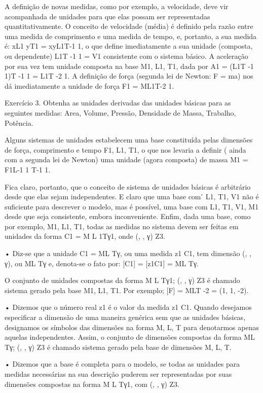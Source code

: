     A definição de novas medidas, como por exemplo, a velocidade, deve vir acompanhada de unidades para que elas possam ser representadas quantitativamente. O conceito de velocidade (média) é definido pela razão entre uma medida de comprimento e uma medida de tempo, e, portanto, a sua medida é: xL1 yT1 = xyL1T-1 1, o que define imediatamente a sua unidade (composta, ou dependente) L1T -1 1 = V1 consistente com o sistema básico. A aceleração por sua vez tem unidade composta na base {M1, L1, T1}, dada por A1 = (L1T -1 1)T -1 1 = L1T -2 1. A definição de força (segunda lei de Newton:
F = ma) nos dá imediatamente a unidade de força F1 = ML1T-2 1.

Exercício 3. Obtenha as unidades derivadas das unidades básicas para as seguintes medidas: Area, Volume, Pressão, Densidade de Massa, Trabalho, Potência.

Alguns sistemas de unidades estabelecem uma base constituída pelas dimensões de força, comprimento e tempo {F1, L1, T1}, o que nos levaria a definir ( ainda com a segunda lei de Newton) uma unidade (agora composta) de massa M1 = F1L-1 1 T-1 1.

Fica claro, portanto, que o conceito de sistema de unidades básicas é arbitrário desde que elas sejam independentes. E claro que uma base com  ́ {L1, T1, V1} não é suficiente para descrever o modelo, mas é possível, uma base com {L1, T1, V1, M1} desde que seja
consistente, embora inconveniente. Enfim, dada uma base, como por exemplo, {M1, L1, T1}, todas as medidas no sistema
devem ser feitas em unidades da forma C1 = M L
\beta1Tγ1, onde (\alpha, \beta, γ) \in Z3.

• Diz-se que a unidade C1 = M\alpha L
\beta Tγ, ou uma medida z1 C1, tem dimensão (\alpha, \beta, γ), ou M\alpha L
\beta Tγ e, denota-se o fato por:
[C1] = [z1C1] = M\alpha L \beta Tγ.

O conjunto de unidades compostas da forma {M L  Tγ1; (\alpha, \beta, γ) \in Z3} é chamado
sistema gerado pela base {M1, L1, T1}. Por exemplo; [F] = MLT -2 = (1, 1, -2).

• Dizemos que o número real z1 é o valor da medida z1 C1. Quando desejamos especificar a dimensão de uma maneira genérica sem que as unidades básicas, designamos os símbolos das dimensões na forma {M, L, T} para denotarmos apenas aquelas independentes. Assim, o conjunto de dimensões compostas da forma
{M\alpha L \beta Tγ; (\alpha, \beta, γ) \in Z3} é chamado sistema gerado pela base de dimensões {M, L, T}.

• Dizemos que a base é completa para o modelo, se todas as unidades para medidas necessárias na sua descrição puderem ser representadas por suas dimensões compostas na forma M L  Tγ1, com (\alpha, \beta, γ) \in Z3.

